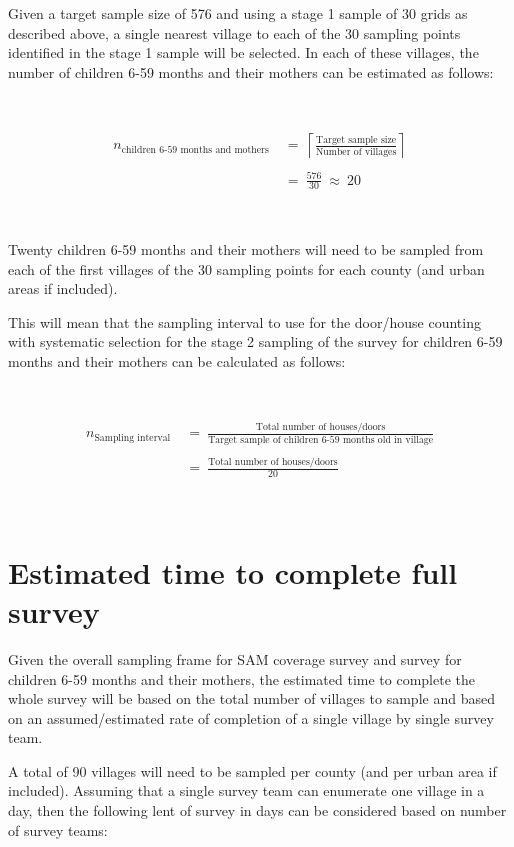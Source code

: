 \documentclass[12pt,a4paper]{book}
\theoremstyle{definition}
\theoremstyle{definition}
\theoremstyle{definition}
\theoremstyle{remark}
\begin{document}
Given a target sample size of 576 and using a stage 1 sample of 30 grids
as described above, a single nearest village to each of the 30 sampling
points identified in the stage 1 sample will be selected. In each of
these villages, the number of children 6-59 months and their mothers can
be estimated as follows:

~

\[\begin{aligned} 
n_{\text{children 6-59 months and mothers}} & ~ = ~ \left \lceil \frac{\text{Target sample size}}{\text{Number of villages}} \right \rceil \\
\\
& ~ = ~ \frac{576}{30} ~ \approx ~ 20
\end{aligned}\]

~

Twenty children 6-59 months and their mothers will need to be sampled
from each of the first villages of the 30 sampling points for each
county (and urban areas if included).

This will mean that the sampling interval to use for the door/house
counting with systematic selection for the stage 2 sampling of the
survey for children 6-59 months and their mothers can be calculated as
follows:

~

\[\begin{aligned}
n_{\text{Sampling interval}} & ~ = ~ \frac{\text{Total number of houses/doors}}{\text{Target sample of children 6-59 months old in village}} \\
\\
& ~ = ~ \frac{\text{Total number of houses/doors}}{\text{20}}
\end{aligned}\]

~

\hypertarget{estimated-time-to-complete-full-survey}{%
\section{Estimated time to complete full
survey}\label{estimated-time-to-complete-full-survey}}

Given the overall sampling frame for SAM coverage survey and survey for
children 6-59 months and their mothers, the estimated time to complete
the whole survey will be based on the total number of villages to sample
and based on an assumed/estimated rate of completion of a single village
by single survey team.

A total of 90 villages will need to be sampled per county (and per urban
area if included). Assuming that a single survey team can enumerate one
village in a day, then the following lent of survey in days can be
considered based on number of survey teams:
\end{document}

